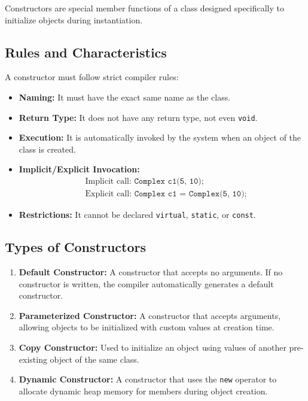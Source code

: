 \documentclass[12pt,a4paper]{article}
\begin{document}
Constructors are special member functions of a class designed specifically to initialize objects during instantiation.

\subsection{Rules and Characteristics}
A constructor must follow strict compiler rules:
\begin{itemize}[leftmargin=*, itemsep=3pt]
  \item \textbf{Naming:} It must have the exact same name as the class.
  \item \textbf{Return Type:} It does not have any return type, not even \texttt{void}.
  \item \textbf{Execution:} It is automatically invoked by the system when an object of the class is created.
  \item \textbf{Implicit/Explicit Invocation:} 
    \begin{align}
      &\text{Implicit call: } \texttt{Complex c1(5, 10);} \\
      &\text{Explicit call: } \texttt{Complex c1 = Complex(5, 10);}
    \end{align}
  \item \textbf{Restrictions:} It cannot be declared \texttt{virtual}, \texttt{static}, or \texttt{const}.
\end{itemize}

\subsection{Types of Constructors}
\begin{enumerate}[label=\textbf{\arabic*.}, leftmargin=*, itemsep=4pt]
  \item \textbf{Default Constructor:} A constructor that accepts no arguments. If no constructor is written, the compiler automatically generates a default constructor.
  \item \textbf{Parameterized Constructor:} A constructor that accepts arguments, allowing objects to be initialized with custom values at creation time.
  \item \textbf{Copy Constructor:} Used to initialize an object using values of another pre-existing object of the same class.
  \item \textbf{Dynamic Constructor:} A constructor that uses the \texttt{new} operator to allocate dynamic heap memory for members during object creation.
\end{enumerate}
\end{document}
